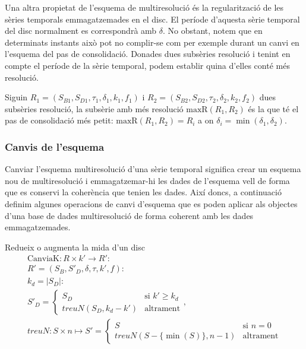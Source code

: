 Una altra propietat de l'esquema de multiresolució és la
regularització de les sèries temporals emmagatzemades en el disc. El
període d'aquesta sèrie temporal del disc normalment es correspondrà
amb $\delta$. No obstant, notem que en determinats instants això pot
no complir-se com per exemple durant un canvi en l'esquema del pas de
consolidació. Donades dues subsèries resolució i tenint en compte el
període de la sèrie temporal, podem establir quina d'elles conté més
resolució.
\begin{definition}
  Siguin $R_1=(S_{B1},S_{D1},\tau_1,\delta_1,k_1,f_1)$ i
  $R_2=(S_{B2},S_{D2},\tau_2,\delta_2,k_2,f_2)$ dues subsèries
  resolució, la subsèrie amb més resolució $\text{maxR}(R_1,R_2)$ és
  la que té el pas de consolidació més petit: $\text{maxR}(R_1,R_2) =
  R_i$ a on $\delta_i = \min(\delta_1,\delta_2)$.
\end{definition}




\subsubsection{Canvis de l'esquema}

Canviar l'esquema multiresolució d'una sèrie temporal significa crear
un esquema nou de multiresolució i emmagatzemar-hi les dades de
l'esquema vell de forma que es conservi la coherència que tenien les
dades. Així doncs, a continuació definim algunes operacions de canvi
d'esquema que es poden aplicar als objectes d'una base de dades
multiresolució de forma coherent amb les dades emmagatzemades.


\todo{}

Redueix o augmenta la mida d'un disc
  \begin{gather*}
    \text{CanviaK}: R \times k' \longrightarrow R': \\
    R' = (S_B,S'_D,\delta,\tau,k',f) : \\
    k_d = |S_D|:\\
    S'_D = \begin{cases}
      S_D         & \text{si } k' \geq k_d   \\
      treuN(S_D,k_d-k')    & \text{altrament}
    \end{cases}, \\
    treuN: S \times n \mapsto S'=  
    \begin{cases}
      S                & \text{si } n=0   \\
      treuN(S - \{\min(S)\},n-1)  & \text{altrament}
    \end{cases}
\end{gather*}


